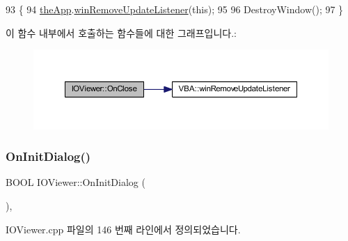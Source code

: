\begin{DoxyCode}
93 \{
94   \mbox{\hyperlink{_v_b_a_8cpp_a8095a9d06b37a7efe3723f3218ad8fb3}{theApp}}.\mbox{\hyperlink{class_v_b_a_a2d31a0656df2230310aa8dc9e3a735d3}{winRemoveUpdateListener}}(\textcolor{keyword}{this});
95   
96   DestroyWindow();
97 \}
\end{DoxyCode}
이 함수 내부에서 호출하는 함수들에 대한 그래프입니다.\+:
\nopagebreak
\begin{figure}[H]
\begin{center}
\leavevmode
\includegraphics[width=350pt]{class_i_o_viewer_a99c1044f4eed5c69ca652edfc032289d_cgraph}
\end{center}
\end{figure}
\mbox{\label{class_i_o_viewer_a4d36007016944a2ed21ee72323204f00}} 
\subsubsection{\texorpdfstring{On\+Init\+Dialog()}{OnInitDialog()}}
{\footnotesize\ttfamily B\+O\+OL I\+O\+Viewer\+::\+On\+Init\+Dialog (\begin{DoxyParamCaption}{ }\end{DoxyParamCaption})\hspace{0.3cm}{\ttfamily [protected]}, {\ttfamily [virtual]}}



I\+O\+Viewer.\+cpp 파일의 146 번째 라인에서 정의되었습니다.


